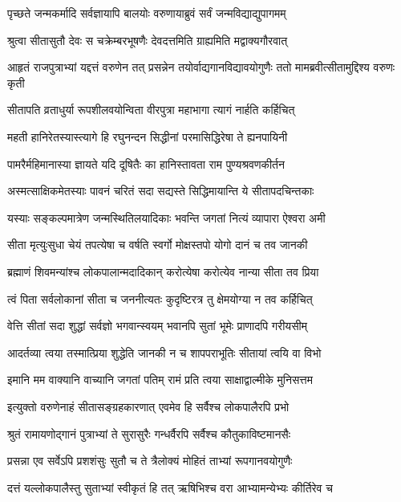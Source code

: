 \twolineshloka
{पृच्छते जन्मकर्मादि सर्वज्ञायापि बालयोः}
{वरुणायाब्रुवं सर्वं जन्मविद्याद्युपागमम्}%

\twolineshloka
{श्रुत्वा सीतासुतौ देवः स चक्रेम्बरभूषणैः}
{देवदत्तमिति ग्राह्यमिति मद्वाक्यगौरवात्}%


\threelineshloka
{आहृतं राजपुत्राभ्यां यद्दत्तं वरुणेन तत्}
{प्रसन्नेन तयोर्वाद्यगानविद्यावयोगुणैः}
{ततो मामब्रवीत्सीतामुद्दिश्य वरुणः कृती}%

\twolineshloka
{सीतापति व्रताधुर्या रूपशीलवयोन्विता}
{वीरपुत्रा महाभागा त्यागं नार्हति कर्हिचित्}%

\twolineshloka
{महती हानिरेतस्यास्त्यागे हि रघुनन्दन}
{सिद्धीनां परमासिद्धिरेषा ते ह्यनपायिनी}%

\twolineshloka
{पामरैर्महिमानास्या ज्ञायते यदि दूषितैः}
{का हानिस्तावता राम पुण्यश्रवणकीर्तन}%

\twolineshloka
{अस्मत्साक्षिकमेतस्याः पावनं चरितं सदा}
{सद्यस्ते सिद्धिमायान्ति ये सीतापदचिन्तकाः}%

\twolineshloka
{यस्याः सङ्कल्पमात्रेण जन्मस्थितिलयादिकाः}
{भवन्ति जगतां नित्यं व्यापारा ऐश्वरा अमी}%

\twolineshloka
{सीता मृत्युःसुधा चेयं तपत्येषा च वर्षति}
{स्वर्गो मोक्षस्तपो योगो दानं च तव जानकी}%

\twolineshloka
{ब्रह्माणं शिवमन्यांश्च लोकपालान्मदादिकान्}
{करोत्येषा करोत्येव नान्या सीता तव प्रिया}%

\twolineshloka
{त्वं पिता सर्वलोकानां सीता च जननीत्यतः}
{कुदृष्टिरत्र तु क्षेमयोग्या न तव कर्हिचित्}%

\twolineshloka
{वेत्ति सीतां सदा शुद्धां सर्वज्ञो भगवान्स्वयम्}
{भवानपि सुतां भूमेः प्राणादपि गरीयसीम्}%

\twolineshloka
{आदर्तव्या त्वया तस्मात्प्रिया शुद्धेति जानकी}
{न च शापपराभूतिः सीतायां त्वयि वा विभो}%

\twolineshloka
{इमानि मम वाक्यानि वाच्यानि जगतां पतिम्}
{रामं प्रति त्वया साक्षाद्वाल्मीके मुनिसत्तम}%

\twolineshloka
{इत्युक्तो वरुणेनाहं सीतासङ्ग्रहकारणात्}
{एवमेव हि सर्वैश्च लोकपालैरपि प्रभो}%

\twolineshloka
{श्रुतं रामायणोद्गानं पुत्राभ्यां ते सुरासुरैः}
{गन्धर्वैरपि सर्वैश्च कौतुकाविष्टमानसैः}%

\twolineshloka
{प्रसन्ना एव सर्वेऽपि प्रशशंसुः सुतौ च ते}
{त्रैलोक्यं मोहितं ताभ्यां रूपगानवयोगुणैः}%

\twolineshloka
{दत्तं यल्लोकपालैस्तु सुताभ्यां स्वीकृतं हि तत्}
{ऋषिभिश्च वरा आभ्यामन्येभ्यः कीर्तिरेव च}%


